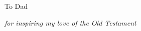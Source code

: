 ~\bigskip

~\bigskip

{\noindent To Dad}

\medskip

{\noindent \textit{for inspiring my love of the Old Testament}}
